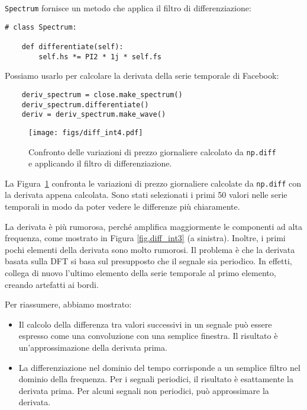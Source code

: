 \documentclass[12pt]{book} \usepackage[width=5.5in,height=8.5in, hmarginratio=3:2,vmarginratio=1:1]{geometry}
\begin{document}
{\tt Spectrum} fornisce un metodo che applica il filtro di differenziazione:

\begin{verbatim} 
# class Spectrum:

    def differentiate(self):
        self.hs *= PI2 * 1j * self.fs
 \end{verbatim} 

Possiamo usarlo per calcolare la derivata della serie temporale di Facebook:

\begin{verbatim} 
    deriv_spectrum = close.make_spectrum()
    deriv_spectrum.differentiate()
    deriv = deriv_spectrum.make_wave()
 \end{verbatim} 

\begin{figure} 

\centerline{\texttt{[image: figs/diff\_int4.pdf]}} \caption{Confronto delle variazioni di prezzo giornaliere calcolato da {\tt np.diff} e applicando il filtro di differenziazione.} \label{fig.diff_int4} \end{figure} 

La Figura~\ref{fig.diff_int4} confronta le variazioni di prezzo giornaliere calcolate da {\tt np.diff} con la derivata appena calcolata. Sono stati selezionati i primi 50 valori nelle serie temporali in modo da poter vedere le differenze più chiaramente.

La derivata è più rumorosa, perché amplifica maggiormente le componenti ad alta frequenza, come mostrato in Figura \ref{fig.diff_int3} (a sinistra). Inoltre, i primi pochi elementi della derivata sono molto rumorosi. Il problema è che la derivata basata sulla DFT si basa sul presupposto che il segnale sia periodico. In effetti, collega di nuovo l'ultimo elemento della serie temporale al primo elemento, creando artefatti ai bordi.

Per riassumere, abbiamo mostrato:

\begin{itemize} 

\item Il calcolo della differenza tra valori successivi in un segnale può essere espresso come una convoluzione con una semplice finestra. Il risultato è un'approssimazione della derivata prima.

\item La differenziazione nel dominio del tempo corrisponde a un semplice filtro nel dominio della frequenza. Per i segnali periodici, il risultato è esattamente la derivata prima. Per alcuni segnali non periodici, può approssimare la derivata.

\end{itemize} 
\end{document}
